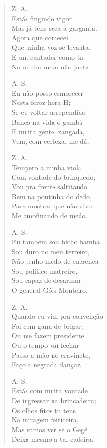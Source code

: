 \begin{verse}
Z. A.\\
Estás fingindo vigor\\
Mas já tens seca a garganta.\\
Agora que comecei\\
Que minha voz se levanta,\\
E um cantador como tu\\
Na minha mesa não janta.

A. S.\\
Eu não posso esmorecer\\
Nesta feroz hora H;\\
Se eu voltar arrependido\\
Banco na vida o gambá\\
E muita gente, zangada,\\
Vem, com certeza, me dá.

Z. A.\\
Tempero a minha viola\\
Com vontade do brinquedo;\\
Vou pra frente saltitando\\
Bem na pontinha do dedo,\\
Para mostrar que não vivo\\
Me amofinando de medo.

A. S.\\
Eu também sou bicho bamba\\
Sou duro no meu terreiro,\\
Não tenho medo de encrenca\\
Sou político matreiro,\\
Sou capaz de desarmar\\
O general Góis Monteiro.


Z. A.\\
Quando eu vim pra convenção\\
Foi com gana de brigar;\\
Ou me fazem presidente\\
Ou o tempo vai fechar;\\
Passo a mão no cravinote,\\
Faço a negrada dançar.

A. S.\\
Estás com muita vontade\\
De ingressar na brincadeira;\\
Os olhos fitos tu tens\\
Na miragem feiticeira,\\
Mas vamos ver se o Gegê\\
Deixa mesmo a tal cadeira.


\end{verse}
